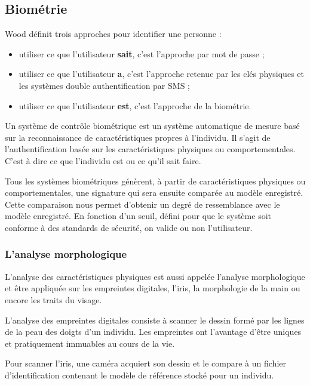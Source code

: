\subsection{Biométrie}

Wood\cite{wood1977} définit trois approches pour identifier une personne :

\begin{itemize}
	\item utiliser ce que l'utilisateur \textbf{sait}, c'est l'approche par mot de passe ;
	\item utiliser ce que l'utilisateur \textbf{a}, c'est l'approche retenue par les clés physiques et les systèmes double authentification par SMS ;
	\item utiliser ce que l'utilisateur \textbf{est}, c'est l'approche de la biométrie.
\end{itemize}

Un système de contrôle biométrique est un système automatique de mesure basé sur la reconnaissance de caractéristiques propres à l'individu. Il s'agit de l'authentification basée sur les caractéristiques physiques ou comportementales. C'est à dire ce que l'individu est ou ce qu'il sait faire.

Tous les systèmes biométriques génèrent, à partir de caractéristiques physiques ou comportementales, une signature qui sera ensuite comparée au modèle enregistré. Cette comparaison nous permet d'obtenir un degré de ressemblance avec le modèle enregistré. En fonction d'un seuil, défini pour que le système soit conforme à des standards de sécurité, on valide ou non l'utilisateur.

\subsubsection{L'analyse morphologique}

L'analyse des caractéristiques physiques est aussi appelée l'analyse morphologique et être appliquée sur les empreintes digitales, l'iris, la morphologie de la main ou encore les traits du visage.

L'analyse des empreintes digitales consiste à scanner le dessin formé par les lignes de la peau des doigts d'un individu. Les empreintes ont l'avantage d'être uniques et pratiquement immuables au cours de la vie.

Pour scanner l'iris, une caméra acquiert son dessin et le compare à un fichier d'identification contenant le modèle de référence stocké pour un individu.

